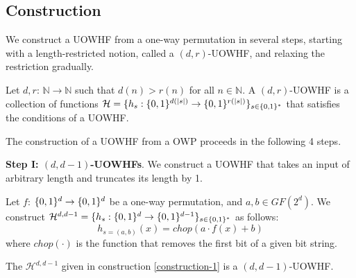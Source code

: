\subsection{Construction}
We construct a UOWHF from a one-way permutation in several steps, starting with a length-restricted notion, called a $(d,r)$-UOWHF, and relaxing the restriction gradually. 

\begin{definition}[$(d,r)$-UOWHFs]
Let $d,r$: $\mathbb{N}\rightarrow\mathbb{N}$ such that $d(n) > r(n)$ for all $n \in \mathbb{N}$. A $(d,r)$-UOWHF is a collection of functions $\mathcal{H} = \{h_s: \{0,1\}^{d(|s|)}\rightarrow\{0,1\}^{r(|s|)}\}_{s\in\{0,1\}^{*}}$ that satisfies the conditions of a UOWHF.
\end{definition}

The construction of a UOWHF from a OWP proceeds in the following 4 steps.

\noindent\textbf{Step I: $(d, d-1)$-UOWHFs}.
We construct a UOWHF that takes an input of arbitrary length and truncates its length by 1. 
\begin{construction}\label{construction-1}
    Let $f$: $\{0,1\}^{d}\rightarrow\{0,1\}^{d}$ be a one-way permutation, and $a,b\in GF(2^d)$. We construct $\mathcal{H}^{d, d-1} = \{h_s: \{0,1\}^{d}\rightarrow\{0,1\}^{d-1}\}_{s \in \{0,1\}^*}$ as follows: 
    \[
        h_{s=(a,b)}(x)=chop(a\cdot f(x)+b)
    \]
    where $chop(\cdot)$ is the function that removes the first bit of a given bit string. 
\end{construction}

\begin{claim}
    The $\mathcal{H}^{d, d-1}$ given in construction \ref{construction-1} is a $(d,d-1)$-UOWHF.
\end{claim} 

